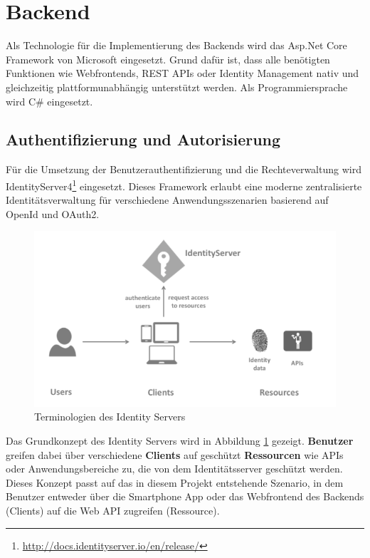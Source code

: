 \section{Backend}
Als Technologie für die Implementierung des Backends wird das Asp.Net Core Framework von Microsoft eingesetzt. Grund dafür ist, dass alle benötigten Funktionen wie Webfrontends, REST APIs oder Identity Management nativ und gleichzeitig plattformunabhängig unterstützt werden. Als Programmiersprache wird C\# eingesetzt.

\subsection{Authentifizierung und Autorisierung}
Für die Umsetzung der Benutzerauthentifizierung und die Rechteverwaltung wird IdentityServer4\footnote{\url{http://docs.identityserver.io/en/release/}} eingesetzt. Dieses Framework erlaubt eine moderne zentralisierte Identitätsverwaltung für verschiedene Anwendungsszenarien basierend auf OpenId und OAuth2. 

\begin{figure}[h]
  \begin{center}
    \includegraphics[width=\textwidth]{./img/BackendIdentityServer.png}
    \caption{Terminologien des Identity Servers}
    \label{fig:backendIdentityServer}
  \end{center}
\end{figure}

Das Grundkonzept des Identity Servers wird in Abbildung \ref{fig:backendIdentityServer} gezeigt. \textbf{Benutzer} greifen dabei über verschiedene \textbf{Clients} auf geschützt \textbf{Ressourcen} wie APIs oder Anwendungsbereiche zu, die von dem Identitätsserver geschützt werden. Dieses Konzept passt auf das in diesem Projekt entstehende Szenario, in dem Benutzer entweder über die Smartphone App oder das Webfrontend des Backends (Clients) auf die Web API zugreifen (Ressource).

